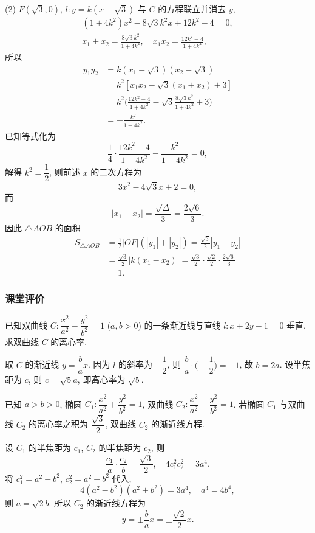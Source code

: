     (2) $F(\sqrt3,0)$, $l\colon y= k(x-\sqrt3)$ 与 $C$ 的方程联立并消去 $y$,
    \[\begin{gathered}
        (1+4k^2)x^2- 8\sqrt3 k^2x+ 12k^2- 4= 0,\\
        x_1+x_2= \frac{8\sqrt3 k^2}{1+4k^2},\quad
        x_1x_2= \frac{12k^2- 4}{1+4k^2},
    \end{gathered}\]
    所以
    \[\begin{aligned}
        y_1y_2&= k(x_1-\sqrt3)(x_2-\sqrt3)\\
        &= k^2[x_1x_2 -\sqrt3(x_1+x_2)+ 3]\\
        &= k^2\biggl(\frac{12k^2- 4}{1+4k^2}
            - \sqrt3\frac{8\sqrt3 k^2}{1+4k^2}+ 3\biggr)\\
        &= -\frac{k^2}{1+4k^2}.
    \end{aligned}\]
    已知等式化为
    \[\frac14\cdot \frac{12k^2- 4}{1+4k^2}- \frac{k^2}{1+4k^2}= 0,\]
    解得 $k^2= \dfrac12$, 则前述 $x$ 的二次方程为 
    \[3x^2- 4\sqrt3x+2= 0,\]
    而
    \[|x_1-x_2|= \frac{\sqrt{\Delta}}{3}= \frac{2\sqrt6}{3}.\]
    因此 $\triangle AOB$ 的面积
    \[\begin{aligned}
        S_{\triangle AOB}&= \frac12|OF|(|y_1|+ |y_2|)
            = \frac{\sqrt3}2{|y_1-y_2|}\\
        &= \frac{\sqrt3}2{|k(x_1-x_2)|}
            = \frac{\sqrt3}2\cdot \frac{\sqrt2}2\cdot \frac{2\sqrt6}3\\
        &= 1.
    \end{aligned}\]
\endsolution

\subsubsection{课堂评价}
\begin{exercise}
    已知双曲线 $C\colon \dfrac{x^2}{a^2}- \dfrac{y^2}{b^2}=1$ ($a,b>0$) 的一条渐近线与直线 $l\colon x+2y-1=0$ 垂直, 求双曲线 $C$ 的离心率.
\end{exercise}
\beginsolution
    取 $C$ 的渐近线 $y=\dfrac{b}a x$. 因为 $l$ 的斜率为 $-\dfrac12$, 则 $\dfrac{b}a\cdot\biggl(-\dfrac12\biggr)= -1$, 故 $b=2a$. 设半焦距为 $c$, 则 $c=\sqrt5a$, 即离心率为 $\sqrt5$.
\endsolution

\begin{exercise}
    已知 $a>b>0$, 椭圆 $C_1\colon \dfrac{x^2}{a^2}+ \dfrac{y^2}{b^2}=1$, 双曲线 $C_2\colon \dfrac{x^2}{a^2}- \dfrac{y^2}{b^2}=1$. 若椭圆 $C_1$ 与双曲线 $C_2$ 的离心率之积为 $\dfrac{\sqrt3}2$, 双曲线 $C_2$ 的渐近线方程.
\end{exercise}
\beginsolution
    设 $C_1$ 的半焦距为 $c_1$, $C_2$ 的半焦距为 $c_2$, 则
    \[\dfrac{c_1}a\cdot \dfrac{c_2}b= \frac{\sqrt3}2,\quad
    4c_1^2c_2^2= 3a^4.\]
    将 $c_1^2= a^2-b^2$, $c_2^2= a^2+b^2$ 代入,
    \[4(a^2-b^2)(a^2+b^2)= 3a^4,\quad a^4= 4b^4,\]
    则 $a=\sqrt2b$. 所以 $C_2$ 的渐近线方程为
    \[y= \pm\frac{b}a x= \pm\frac{\sqrt2}2 x.\]
\endsolution

